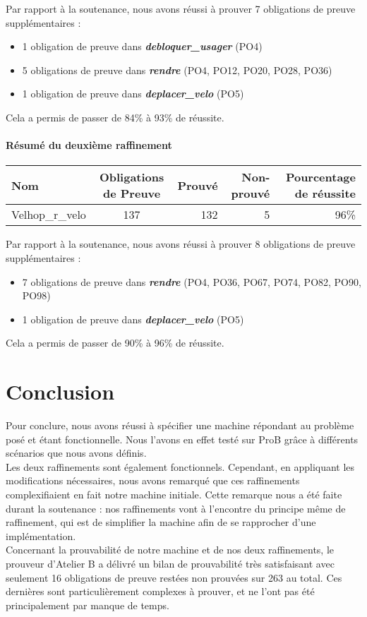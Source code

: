 \documentclass[12pt]{article}
\begin{document}
Par rapport à la soutenance, nous avons réussi à prouver 7 obligations de preuve supplémentaires :
\begin{itemize}
  \item 1 obligation de preuve dans \textit{\textbf{debloquer\_usager}} (PO4)
  \item 5 obligations de preuve dans \textit{\textbf{rendre}} (PO4, PO12, PO20, PO28, PO36)
  \item 1 obligation de preuve dans \textit{\textbf{deplacer\_velo}} (PO5)
\end{itemize}

Cela a permis de passer de 84\% à 93\% de réussite.

\paragraph{Résumé du deuxième raffinement}
\begin{center}
	\begin{tabular}{| l | c | r | r|r|}
		\hline
		Nom & Obligations de Preuve & Prouvé & Non-prouvé & Pourcentage de réussite\\ \hline
    Velhop\_r\_velo & 137 & 132 & 5 & 96\% \\ \hline
	\end{tabular}
\end{center}

Par rapport à la soutenance, nous avons réussi à prouver 8 obligations de preuve supplémentaires :
\begin{itemize}
  \item 7 obligations de preuve dans \textit{\textbf{rendre}} (PO4, PO36, PO67, PO74, PO82, PO90, PO98)
  \item 1 obligation de preuve dans \textit{\textbf{deplacer\_velo}} (PO5)
\end{itemize}

Cela a permis de passer de 90\% à 96\% de réussite.

\newpage
\section{Conclusion}

Pour conclure, nous avons réussi à spécifier une machine répondant au problème posé et étant fonctionnelle. Nous l'avons en effet testé sur ProB grâce à différents scénarios que nous avons définis. \\

Les deux raffinements sont également fonctionnels. Cependant, en appliquant les modifications nécessaires, nous avons remarqué que ces raffinements complexifiaient en fait notre machine initiale. Cette remarque nous a été faite durant la soutenance : nos raffinements vont à l'encontre du principe même de raffinement, qui est de simplifier la machine afin de se rapprocher d'une implémentation.\\

Concernant la prouvabilité de notre machine et de nos deux raffinements, le prouveur d'Atelier B a délivré un bilan de prouvabilité très satisfaisant avec seulement 16 obligations de preuve restées non prouvées sur 263 au total. Ces dernières sont particulièrement complexes à prouver, et ne l'ont pas été principalement par manque de temps.
\end{document}
